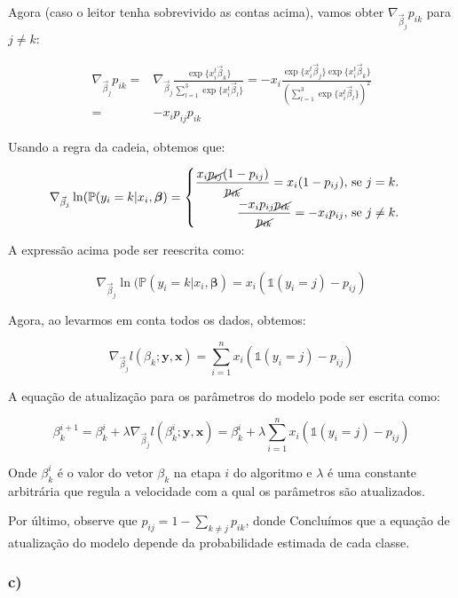 \documentclass[
]{article}
\begin{document}
Agora (caso o leitor tenha sobrevivido as contas acima), vamos obter
\(\nabla_{\vec{\beta}_{j}}p_{ik}\) para \(j\neq k\):

\[
\begin{aligned}
\nabla_{\vec{\beta}_{j}}p_{ik}=&\nabla_{\vec{\beta}_{j}}\frac{\exp\{{x_i^t\vec{\beta}_k}\}}{\sum_{l=1}^{3}\exp\{{x_i^t\vec{\beta}_l}\}}=-x_i\frac{\exp\{{x_i^t\vec{\beta}_j}\}\exp\{{x_i^t\vec{\beta}_k}\}}{\left(\sum_{l=1}^{3}\exp\{{x_i^t\vec{\beta}_l}\}\right)^2}\\
=&-x_ip_{ij}p_{ik}
\end{aligned}
\]

Usando a regra da cadeia, obtemos que:

\[
\nabla_{\vec{\beta}_{j}}\ln(\mathbb{P}(y_i=k|x_i,\boldsymbol{\beta})=\begin{cases}
\begin{aligned}
\frac{x_i\cancel{p_{ij}}(1-p_{ij})}{\cancel{p_{ik}}}=x_i(1-p_{ij}),&\text{ se }j=k.\\
\frac{-x_ip_{ij}\cancel{p_{ik}}}{\cancel{p_{ik}}}=-x_ip_{ij},&\text{ se }j\neq k.
\end{aligned}
\end{cases}
\]

A expressão acima pode ser reescrita como:

\[
\nabla_{\vec{\beta}_{j}}\ln(\mathbb{P}(y_i=k|x_i,\boldsymbol{\beta})=x_i(\mathds{1}(y_i=j)-p_{ij})
\]

Agora, ao levarmos em conta todos os dados, obtemos:

\[
\nabla_{\vec{\beta}_{j}}l(\beta_k;\boldsymbol{y},\boldsymbol{x})=\sum_{i=1}^nx_i(\mathds{1}(y_i=j)-p_{ij})
\]

A equação de atualização para os parâmetros do modelo pode ser escrita
como:

\[
\beta_k^{i+1}=\beta_k^{i}+\lambda\nabla_{\vec{\beta}_{j}}l(\beta_k^{i};\boldsymbol{y},\boldsymbol{x})=\beta_k^i+\lambda\sum_{i=1}^nx_i(\mathds{1}(y_i=j)-p_{ij})
\]

Onde \(\beta_k^{i}\) é o valor do vetor \(\beta_k\) na etapa \(i\) do
algoritmo e \(\lambda\) é uma constante arbitrária que regula a
velocidade com a qual os parâmetros são atualizados.

Por último, observe que \(p_{ij}=1-\sum_{k\neq j}p_{ik}\), donde
Concluímos que a equação de atualização do modelo depende da
probabilidade estimada de cada classe.

\hypertarget{c-2}{%
\subsubsection{c)}\label{c-2}}
\end{document}
